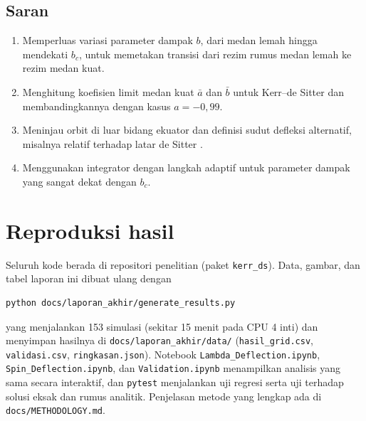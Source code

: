 \documentclass[11pt,a4paper]{article}
\begin{document}
\subsection{Saran}

\begin{enumerate}
  \item Memperluas variasi parameter dampak $b$, dari medan lemah hingga mendekati $b_c$, untuk memetakan
        transisi dari rezim rumus medan lemah ke rezim medan kuat.
  \item Menghitung koefisien limit medan kuat $\bar a$ dan $\bar b$ \citep{bozza2002gravitational} untuk
        Kerr--de Sitter dan membandingkannya dengan kasus $a = -0{,}99$.
  \item Meninjau orbit di luar bidang ekuator dan definisi sudut defleksi alternatif, misalnya relatif
        terhadap latar de Sitter \citep{arakida2018light}.
  \item Menggunakan integrator dengan langkah adaptif untuk parameter dampak yang sangat dekat dengan $b_c$.
\end{enumerate}




\appendix
\section{Reproduksi hasil}

Seluruh kode berada di repositori penelitian (paket \texttt{kerr\_ds}). Data, gambar, dan tabel laporan ini
dibuat ulang dengan
\begin{verbatim}
python docs/laporan_akhir/generate_results.py
\end{verbatim}
yang menjalankan 153 simulasi (sekitar 15 menit pada CPU 4 inti) dan menyimpan hasilnya di
\texttt{docs/laporan\_akhir/data/} (\texttt{hasil\_grid.csv}, \texttt{validasi.csv}, \texttt{ringkasan.json}).
Notebook \texttt{Lambda\_Deflection.ipynb}, \texttt{Spin\_Deflection.ipynb}, dan \texttt{Validation.ipynb}
menampilkan analisis yang sama secara interaktif, dan \texttt{pytest} menjalankan uji regresi serta uji
terhadap solusi eksak dan rumus analitik. Penjelasan metode yang lengkap ada di \texttt{docs/METHODOLOGY.md}.
\end{document}
